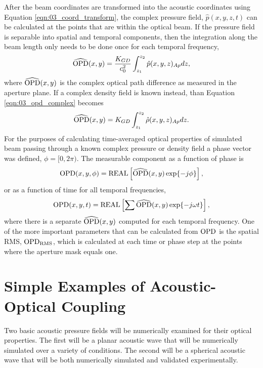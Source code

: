 After the beam coordinates are transformed into the acoustic coordinates using Equation \ref{eqn:03_coord_transform}, the complex pressure field, $\hat{p}(x,y,z,t)$ can be calculated at the points that are within the optical beam.
If the pressure field is separable into spatial and temporal components, then the integration along the beam length only needs to be done once for each temporal frequency,
\begin{equation}
  \widehat{\operatorname{OPD}}(x,y) = \frac{K_{GD}}{c_0^2}\int_{z_1}^{z_2} \hat{p}(x,y,z)_{Ap}dz \textrm{,}
  \label{eqn:03_opd_complex}
\end{equation}
where $\widehat{\operatorname{OPD}}(x,y)$ is the complex optical path difference as measured in the aperture plane.
If a complex density field is known instead, than Equation \ref{eqn:03_opd_complex} becomes
\begin{equation}
  \widehat{\operatorname{OPD}}(x,y) = K_{GD}\int_{z_1}^{z_2} \hat{\rho}(x,y,z)_{Ap}dz \textrm{.}
  \label{eqn:03_opd_complex_density}
\end{equation}
For the purposes of calculating time-averaged optical properties of simulated beam passing through a known complex pressure or density field a phase vector was defined,  $\phi = [0, 2\pi)$.
The measurable component as a function of phase is
\begin{equation}
  \operatorname{OPD}(x,y,\phi) = \operatorname{REAL}\left[\widehat{\operatorname{OPD}}(x,y)\exp\{-j\phi\}\right] \textrm{,}
  \label{eqn:03_opd_real_phase}
\end{equation}
or as a function of time for all temporal frequencies,
\begin{equation}
  \operatorname{OPD}(x,y,t) = \operatorname{REAL}\left[\sum\widehat{\operatorname{OPD}}(x,y)\exp\{-j\omega t\}\right] \textrm{,}
  \label{eqn:03_opd_real}
\end{equation}
where there is a separate $\widehat{\operatorname{OPD}}(x,y)$ computed for each temporal frequency.
One of the more important parameters that can be calculated from $\operatorname{OPD}$ is the spatial RMS, $\operatorname{OPD_{RMS}}$, which is calculated at each time or phase step at the points where the aperture mask equals one.

\section{Simple Examples of Acoustic-Optical Coupling}
\label{sect:03_examples}
Two basic acoustic pressure fields will be numerically examined for their optical properties.
The first will be a planar acoustic wave that will be numerically simulated over a variety of conditions.
The second will be a spherical acoustic wave that will be both numerically simulated and validated experimentally.


